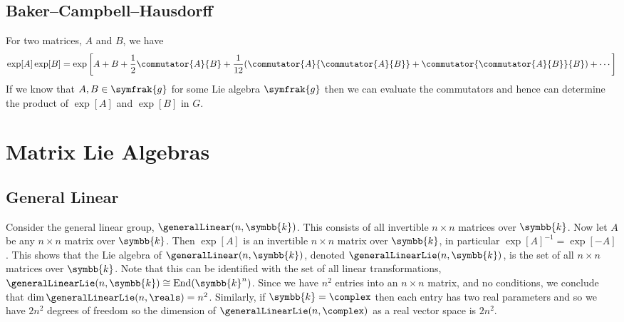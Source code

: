 \documentclass[fleqn]{NotesClass}
\renewcommand{\lie}[1]{\symfrak{#1}}
\newcommand{\isomorphic}{\cong}
\renewcommand{\field}{\symbb{k}}
\DeclareMathOperator{\End}{End}
\begin{document}
    \subsection{Baker--Campbell--Hausdorff}
    For two matrices, \(A\) and \(B\), we have
    \begin{equation*}
        \exp[A]\exp[B] = \exp\left[ A + B + \frac{1}{2}\commutator{A}{B} + \frac{1}{12}(\commutator{A}{\commutator{A}{B}} + \commutator{\commutator{A}{B}}{B}) + \dotsb \right]
    \end{equation*}
    If we know that \(A, B \in \lie{g}\) for some Lie algebra \(\lie{g}\) then we can evaluate the commutators and hence can determine the product of \(\exp[A]\) and \(\exp[B]\) in \(G\).
    
    \section{Matrix Lie Algebras}
    \subsection{General Linear}
    Consider the general linear group, \(\generalLinear(n, \field)\).
    This consists of all invertible \(n \times n\) matrices over \(\field\).
    Now let \(A\) be any \(n \times n\) matrix over \(\field\).
    Then \(\exp[A]\) is an invertible \(n\times n\) matrix over \(\field\), in particular \(\exp[A]^{-1} = \exp[-A]\).
    This shows that the Lie algebra of \(\generalLinear(n, \field)\), denoted \(\generalLinearLie(n, \field)\), is the set of all \(n \times n\) matrices over \(\field\).
    Note that this can be identified with the set of all linear transformations, \(\generalLinearLie(n, \field) \isomorphic \End(\field^n)\).
    Since we have \(n^2\) entries into an \(n \times n\) matrix, and no conditions, we conclude that \(\dim\generalLinearLie(n, \reals) = n^2\).
    Similarly, if \(\field = \complex\) then each entry has two real parameters and so we have \(2n^2\) degrees of freedom so the dimension of \(\generalLinearLie(n, \complex)\) as a real vector space is \(2n^2\).
    
\end{document}
